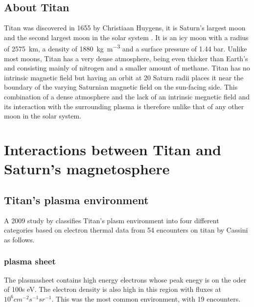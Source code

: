 \documentclass[12pt, parskip=full*, abstract]{scrartcl}
\begin{document}




\subsection{About Titan}
Titan was discovered in 1655 by Christiaan Huygens, it is Saturn's largest moon and the second largest moon in the solar system \parencite{fundamental-planetary-science}. It is an icy moon with a radius of \SI{2575}{\kilo\metre}, a density of \SI{1880}{\kilogram\per\metre^3} and a surface pressure of 1.44 bar. Unlike most moons, Titan has a very dense atmosphere, being even thicker than Earth's and consisting mainly of nitrogen and a smaller amount of methane. Titan has no intrinsic magnetic field but having an orbit at 20 Saturn radii places it near the boundary of the varying Saturnian magnetic field on the sun-facing side. This combination of a dense atmosphere and the lack of an intrinsic megnetic field and its interaction with the surrounding plasma is therefore unlike that of any other moon in the solar system. 


\section{Interactions between Titan and Saturn's magnetosphere}


\subsection{Titan's plasma environment}
A 2009 study by \textcite{Rymer-class} classifies Titan's plasm environment into four different categories based on electron thermal data from 54 encounters on titan by Cassini as follows. 

\subsubsection{plasma sheet}
The plasmasheet contains high energy electrons whose peak enegy is on the oder of 100s eV. The electron density is also high in this region with fluxes at $10^6cm^{-2}s^{-1}sr^{-1}$. This was the most common environment, with 19 encounters. \parencite{Rymer-class}
\end{document}

